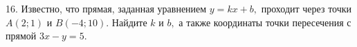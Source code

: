 16. Известно, что прямая, заданная уравнением $y=kx+b,$ проходит через точки $A(2;1)$ и $B(-4;10).$ Найдите $k$ и $b,$ а также координаты точки пересечения с прямой $3x-y=5.$\\
